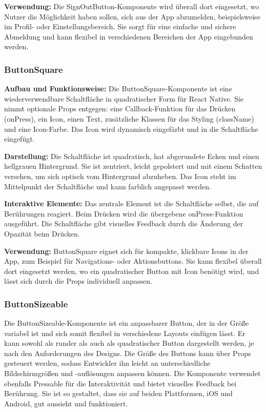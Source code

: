\noindent\textbf{Verwendung:}
Die SignOutButton-Komponente wird überall dort eingesetzt, wo Nutzer die Möglichkeit haben sollen, sich aus der App abzumelden, beispielsweise im Profil- oder Einstellungsbereich. Sie sorgt für eine einfache und sichere Abmeldung und kann flexibel in verschiedenen Bereichen der App eingebunden werden.

\subsubsection{ButtonSquare}

\noindent\textbf{Aufbau und Funktionsweise:}
Die ButtonSquare-Komponente ist eine wiederverwendbare Schaltfläche in quadratischer Form für React Native. Sie nimmt optionale Props entgegen: eine Callback-Funktion für das Drücken (onPress), ein Icon, einen Text, zusätzliche Klassen für das Styling (className) und eine Icon-Farbe. Das Icon wird dynamisch eingefärbt und in die Schaltfläche eingefügt.

\noindent\textbf{Darstellung:}
Die Schaltfläche ist quadratisch, hat abgerundete Ecken und einen hellgrauen Hintergrund. Sie ist zentriert, leicht gepolstert und mit einem Schatten versehen, um sich optisch vom Hintergrund abzuheben. Das Icon steht im Mittelpunkt der Schaltfläche und kann farblich angepasst werden.

\noindent\textbf{Interaktive Elemente:}
Das zentrale Element ist die Schaltfläche selbst, die auf Berührungen reagiert. Beim Drücken wird die übergebene onPress-Funktion ausgeführt. Die Schaltfläche gibt visuelles Feedback durch die Änderung der Opazität beim Drücken.

\noindent\textbf{Verwendung:}
ButtonSquare eignet sich für kompakte, klickbare Icons in der App, zum Beispiel für Navigations- oder Aktionsbuttons. Sie kann flexibel überall dort eingesetzt werden, wo ein quadratischer Button mit Icon benötigt wird, und lässt sich durch die Props individuell anpassen.

\subsubsection{ButtonSizeable}
Die ButtonSizeable-Komponente ist ein anpassbarer Button, der in der Größe variabel ist und sich somit flexibel in verschiedene Layouts einfügen lässt. Er kann sowohl als runder als auch als quadratischer Button dargestellt werden, je nach den Anforderungen des Designs. Die Größe des Buttons kann über Props gesteuert werden, sodass Entwickler ihn leicht an unterschiedliche Bildschirmgrößen und -auflösungen anpassen können. Die Komponente verwendet ebenfalls Pressable für die Interaktivität und bietet visuelles Feedback bei Berührung. Sie ist so gestaltet, dass sie auf beiden Plattformen, iOS und Android, gut aussieht und funktioniert.

